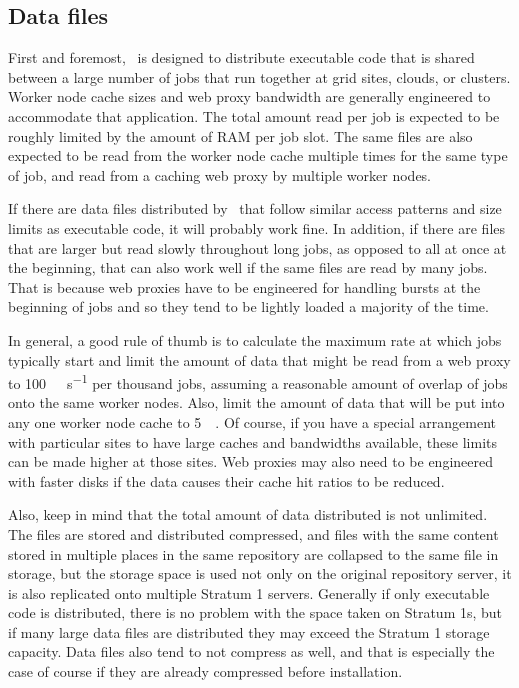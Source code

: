 \subsection{Data files}
First and foremost, \cvmfs\ is designed to distribute executable code that is shared between a large number of jobs that run together at grid sites, clouds, or clusters.
Worker node cache sizes and web proxy bandwidth are generally engineered to accommodate that application.
The total amount read per job is expected to be roughly limited by the amount of RAM per job slot.
The same files are also expected to be read from the worker node cache multiple times for the same type of job, and read from a caching web proxy by multiple worker nodes.

If there are data files distributed by \cvmfs\ that follow similar access patterns and size limits as executable code, it will probably work fine.
In addition, if there are files that are larger but read slowly throughout long jobs, as opposed to all at once at the beginning, that can also work well if the same files are read by many jobs.
That is because web proxies have to be engineered for handling bursts at the beginning of jobs and so they tend to be lightly loaded a majority of the time.

In general, a good rule of thumb is to calculate the maximum rate at which jobs typically start and limit the amount of data that might be read from a web proxy to \SI{100}{\mega\byte\per\second} per thousand jobs, assuming a reasonable amount of overlap of jobs onto the same worker nodes.
Also, limit the amount of data that will be put into any one worker node cache to \SI{5}{\giga\byte}.
Of course, if you have a special arrangement with particular sites to have large caches and bandwidths available, these limits can be made higher at those sites.
Web proxies may also need to be engineered with faster disks if the data causes their cache hit ratios to be reduced.

Also, keep in mind that the total amount of data distributed is not unlimited.
The files are stored and distributed compressed, and files with the same content stored in multiple places in the same repository are collapsed to the same file in storage, but the storage space is used not only on the original repository server, it is also replicated onto multiple Stratum 1 servers.
Generally if only executable code is distributed, there is no problem with the space taken on Stratum 1s, but if many large data files are distributed they may exceed the Stratum 1
storage capacity.
Data files also tend to not compress as well, and that is especially the case of course if they are already compressed before installation.

